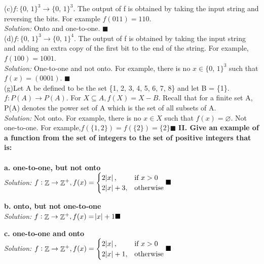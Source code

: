 \documentclass[11pt]{article}
\DeclareMathOperator*{\Z}{\mathbb{Z}}\relax
\begin{document}
		(c)$f: \{0, \, 1\}^3 \rightarrow \{0, \, 1\}^3$. The output of f is obtained by taking the input string and reversing the bits. For example $f(011) = 110$.\\
		\textit{Solution: }
		Onto and one-to-one. $\blacksquare$ \\
		
		(d)$f: \{0, \, 1\}^3 \rightarrow \{0, \, 1\}^4$. The output of f is obtained by taking the input string and adding an extra copy of the first bit to the end of the string. 
		For example, $f(100) = 1001$. \\
		\textit{Solution: }
		One-to-one and not onto. For example, there is no $x \in  \{0, \, 1\}^3$ such that $f(x) = (0001)$. $\blacksquare$ \\
		
		(g)Let A be defined to be the set \{1, 2, 3, 4, 5, 6, 7, 8\} and let B = \{1\}.
		$f: P(A) \rightarrow P(A)$. For $X \subseteq A, f(X) = X - B$. 
		Recall that for a finite set A, P(A) denotes the power set of A which is the set of all subsets of A. \\
		\textit{Solution: }
		Not onto. For example, there is no $x \in  X$ such that $f(x) = \varnothing$. 
		Not one-to-one. For example,$f(\{1, 2\}) = f(\{2\}) = \{2\}\blacksquare$ 
	\newpage
	\textbf{II. Give an example of a function from the set of integers to the set of positive integers that is:}\\
	\\	
		\textbf{a. one-to-one, but not onto} \\
		\textit{Solution: }
		$f: \Z \rightarrow \Z^+, f(x) = 
							\begin{cases}
   								 2\abs{x} , & \text{if } x > 0\\
    								2\abs{x}  + 3,              & \text{otherwise}
							\end{cases} \blacksquare$		
		
		\textbf{b. onto, but not one-to-one} \\
		\textit{Solution: }
		$f: \Z \rightarrow \Z^+, f(x) = \abs{x} + 1 \blacksquare$
		
		\textbf{c. one-to-one and onto} \\
		\textit{Solution: }
		$f: \Z \rightarrow \Z^+, f(x) = 
							\begin{cases}
   								 2\abs{x} , & \text{if } x > 0\\
    								2\abs{x}  + 1,              & \text{otherwise}
							\end{cases} \blacksquare$ \\	
		
\end{document}
